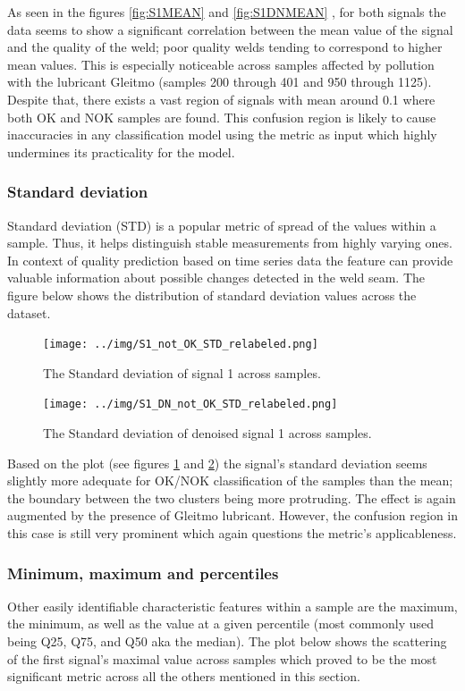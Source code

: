 \documentclass[12pt]{report}
\begin{document}
As seen in the figures \ref{fig:S1MEAN} and \ref{fig:S1DNMEAN} , for both signals the data seems to show a significant correlation between the mean value of the signal and the quality of the weld; poor quality welds tending to correspond to higher mean values. This is especially noticeable across samples affected by pollution with the lubricant Gleitmo (samples 200 through 401 and 950 through 1125). Despite that, there exists a vast region of signals with mean around 0.1 where both OK and NOK samples are found. This confusion region is likely to cause inaccuracies in any classification model using the metric as input which highly undermines its practicality for the model.

\subsubsection{Standard deviation}

Standard deviation (STD) is a popular metric of spread of the values within a sample. Thus, it helps distinguish stable measurements from highly varying ones. In context of quality prediction based on time series data the feature can provide valuable information about possible changes detected in the weld seam. The figure below shows the distribution of standard deviation values across the dataset.

\begin{figure}[H]
	\centering
	\texttt{[image: ../img/S1\_not\_OK\_STD\_relabeled.png]}
	\caption{The Standard deviation of signal 1 across samples.}
	\label{fig:S1STD}
\end{figure}
\begin{figure}[H]
	\centering
	\texttt{[image: ../img/S1\_DN\_not\_OK\_STD\_relabeled.png]}
	\caption{The Standard deviation of denoised signal 1 across samples.}
	\label{fig:S1DNSTD}
\end{figure}

Based on the plot (see figures \ref{fig:S1STD} and \ref{fig:S1DNSTD}) the signal’s standard deviation seems slightly more adequate for OK/NOK classification of the samples than the mean; the boundary between the two clusters being more protruding. The effect is again augmented by the presence of Gleitmo lubricant. However, the confusion region in this case is still very prominent which again questions the metric’s applicableness.

\subsubsection{Minimum, maximum and percentiles}
Other easily identifiable characteristic features within a sample are the maximum, the minimum, as well as the value at a given percentile (most commonly used being Q25, Q75, and Q50 aka the median). The plot below shows the scattering of the first signal’s maximal value across samples which proved to be the most significant metric across all the others mentioned in this section.
\end{document}
